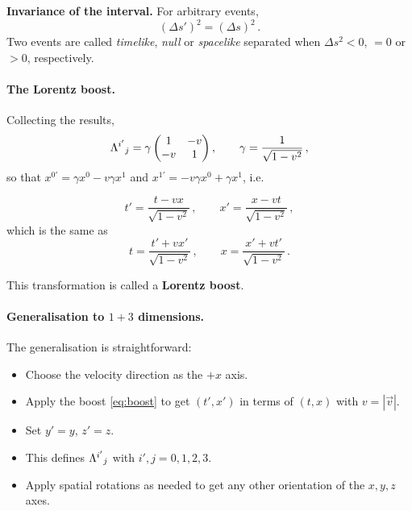 \begin{keyresult}
    \textbf{Invariance of the interval.} For arbitrary events,
    \begin{equation}
        (\Delta s')^2 = (\Delta s)^2 \, .
        \label{eq:interval_invariance}
    \end{equation}
    Two events are called \emph{timelike}, \emph{null} or \emph{spacelike} separated when
    $\Delta s^2 < 0$, $= 0$ or $> 0$, respectively.
\end{keyresult}

\paragraph{The Lorentz boost.}
Collecting the results,
\begin{equation}
    \Lambda^{i'}{}_{j} = \gamma \begin{pmatrix} 1 & -v \\ -v & 1 \end{pmatrix} ,
    \qquad
    \gamma = \frac{1}{\sqrt{1 - v^2}} \, ,
    \label{eq:boost_matrix}
\end{equation}
so that $x^{0'} = \gamma x^0 - v\gamma x^1$ and $x^{1'} = -v\gamma x^0 + \gamma x^1$, i.e.
\begin{keyresult}
    \begin{equation}
        t' = \frac{t - v x}{\sqrt{1 - v^2}} \, , \qquad
        x' = \frac{x - v t}{\sqrt{1 - v^2}} \, ,
        \label{eq:boost}
    \end{equation}
    which is the same as
    \begin{equation}
        t = \frac{t' + v x'}{\sqrt{1 - v^2}} \, , \qquad
        x = \frac{x' + v t'}{\sqrt{1 - v^2}} \, .
        \label{eq:boost_inverse}
    \end{equation}
\end{keyresult}
This transformation is called a \textbf{Lorentz boost}.

\paragraph{Generalisation to $1+3$ dimensions.}
The generalisation is straightforward:
\begin{itemize}[leftmargin=*, nosep]
    \item Choose the velocity direction as the $+x$ axis.
    \item Apply the boost \eqref{eq:boost} to get $(t', x')$ in terms of $(t, x)$ with
          $v = |\vec{v}|$.
    \item Set $y' = y$, $z' = z$.
    \item This defines $\Lambda^{i'}{}_{j}$ with $i', j = 0, 1, 2, 3$.
    \item Apply spatial rotations as needed to get any other orientation of the $x, y, z$ axes.
\end{itemize}

